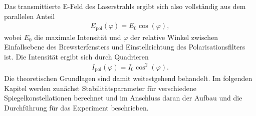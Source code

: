Das transmittierte E-Feld des Laserstrahls ergibt sich also
vollständig aus dem parallelen Anteil
\begin{align}
  E_{\text{pol}}(\varphi) = E_0 \cos(\varphi),
\end{align}
wobei $E_0$ die maximale Intensität und $\varphi$ der relative Winkel zwischen Einfallsebene des Brewsterfensters
und Einstellrichtung des Polarisationsfilters ist. Die Intensität ergibt sich durch Quadrieren
\begin{align}
  I_{\text{pol}}(\varphi) = I_0 \cos^2(\varphi).
\end{align}
Die theoretischen Grundlagen sind damit weitestgehend behandelt. Im folgenden Kapitel werden zunächst
Stabilitätsparameter für verschiedene Spiegelkonstellationen berechnet und im Anschluss daran der
Aufbau und die Durchführung für das Experiment beschrieben.

